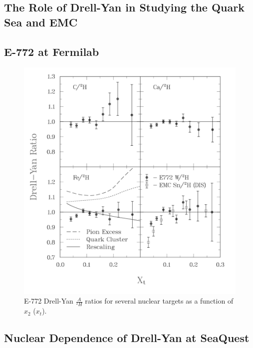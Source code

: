 \subsection{The Role of Drell-Yan in Studying the Quark Sea and EMC }

\subsection{E-772 at Fermilab}

\begin{figure}[h]
	\centering
	\includegraphics[width=\textwidth]{figures/background/dyfig9.png}
	\caption{E-772 Drell-Yan $\frac{A}{^2H}$ ratios for several nuclear targets as a function of $x_2$ ($x_t$)\cite{Alde:1990im}.}
	\label{fig:772-dy}
\end{figure}

\subsection{Nuclear Dependence of Drell-Yan at SeaQuest}

